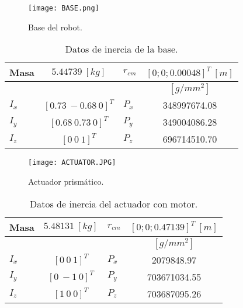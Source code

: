 \begin{figure}[htb!]
    \centering
    \texttt{[image: BASE.png]}
    \caption{Base del robot.}
    \label{fig: cad base}
\end{figure}
% 

\begin{table}[hb!]
 \begin{center}
\begin{tabular}{lclc}
 Masa & $ 5.44739\ [kg]$ & $r_{cm}$ &  $[0; 0; 0.00048]^T \ [m]$ \\
 \hline
 & & & $[g/mm^2]$\\
 \hline
 $ I_x $ & $ [0.73\ -0.68\ 0]^T $ & $ P_x $ & 348997674.08\\
 $ I_y $ & $ [0.68\ 0.73\ 0]^T $ & $ P_y $ & 349004086.28\\
 $ I_z $ & $ [0 \ 0 \ 1]^T $ & $ P_z $ & 696714510.70
\end{tabular}
\end{center}
\caption{Datos de inercia de la base.}
\label{tab: inertia table base}
\end{table}


\begin{figure}[htb!]
    \centering
    \texttt{[image: ACTUATOR.JPG]}
    \caption{Actuador prismático.}
    \label{fig: cad motor}
\end{figure}

\begin{table}[hb!]
 \begin{center}
\begin{tabular}{lclc}


% 


 Masa & $ 5.48131 \ [kg]$ & $r_{cm}$ & $[0; 0; 0.47139]^T \ [m]$ \\
 \hline
 & & & $[g/mm^2]$\\
 \hline
 $ I_x $ & $ [0 \ 0 \ 1]^T $ & $ P_x $ & 2079848.97\\
 $ I_y $ & $ [0 \ -1 \ 0]^T $ & $ P_y $ & 703671034.55\\
 $ I_z $ & $ [1 \ 0 \ 0]^T $ & $ P_z $ & 703687095.26
\end{tabular}
\end{center}
\caption{Datos de inercia del actuador con motor.}
\label{tab: inertia table motor}
\end{table}

